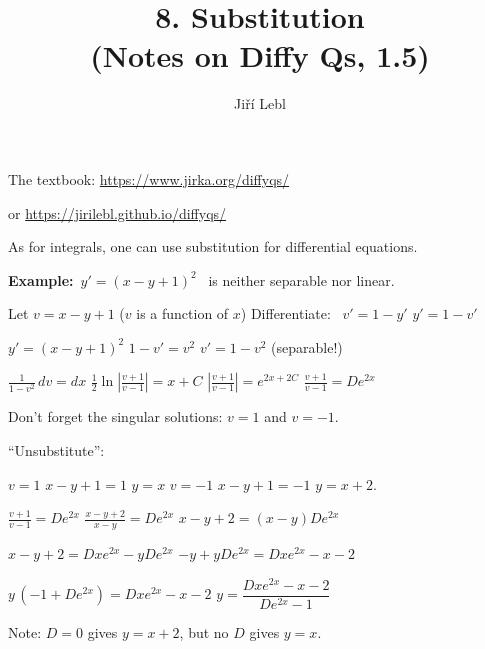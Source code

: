 \documentclass[10pt,aspectratio=169]{beamer}
\author{Ji\v{r}\'i Lebl}
\institute[OSU]{%
Oklahoma State University%
}
\title{8. Substitution\\(Notes on Diffy Qs, 1.5)}
\date{}
\begin{document}
\begin{frame}
\titlepage


\begin{center}
The textbook: \url{https://www.jirka.org/diffyqs/}

or \url{https://jirilebl.github.io/diffyqs/}
\end{center}
\end{frame}

\begin{frame}
As for integrals, one can use substitution for differential equations.

\medskip
\pause

\textbf{Example:}~$y' = {(x-y+1)}^2$~ is neither separable nor linear.

\medskip
\pause

Let $v = x-y+1$
\pause
\quad
($v$ is a function of $x$)
\qquad
\pause
Differentiate: ~$v' = 1 - y'$
\pause
\wthus
$y' = 1-v'$

\medskip
\pause

$y' = {(x-y+1)}^2$
\wthus
$1-v' = v^2$
\pause
\wthus
$v' = 1-v^2$
\quad
\pause
(separable!)

\medskip
\pause

$\displaystyle
\frac{1}{1-v^2} \,dv = dx$
\pause
\wthus
$\displaystyle
\frac{1}{2} \ln \left\lvert  \frac{v+1}{v-1} \right\rvert = x + C$
\pause
\wthus
$\displaystyle
\left\lvert \frac{v+1}{v-1} \right\rvert = e^{2x + 2C}$
\pause
\wthus
$\displaystyle
\frac{v+1}{v-1} = D e^{2x}$

\medskip
\pause

Don't forget the singular solutions: $v=1$ and $v=-1$.

\medskip
\pause

``Unsubstitute'':

\medskip
\pause

$v=1$
\pause
\wthus
$x-y+1=1$
\pause
\wthus $y=x$
\pause
\hfill
$v=-1$
\pause
\wthus
$x-y+1=-1$
\pause
\wthus
$y=x+2$.

\medskip
\pause

$\displaystyle
\frac{v+1}{v-1} = D e^{2x}$
\pause
\wthus
$\displaystyle
\frac{x-y+2}{x-y} = D e^{2x}$
\pause
\wthus
$x-y+2 = (x-y)D e^{2x}$

\medskip

\pause
\wthus
$x-y+2 = Dx e^{2x}-yD e^{2x}$
\pause
\wthus
$-y + yD e^{2x} = Dx e^{2x} - x - 2$

\medskip

\pause
\wthus
$y\,(-1+ D e^{2x}) = Dx e^{2x} - x - 2$
\pause
\wthus
$y  = \dfrac{Dx e^{2x} - x - 2}{D e^{2x}-1}$

\medskip
\pause

Note: $D=0$ gives $y=x+2$, but no $D$ gives $y=x$.

\end{frame}
\end{document}
